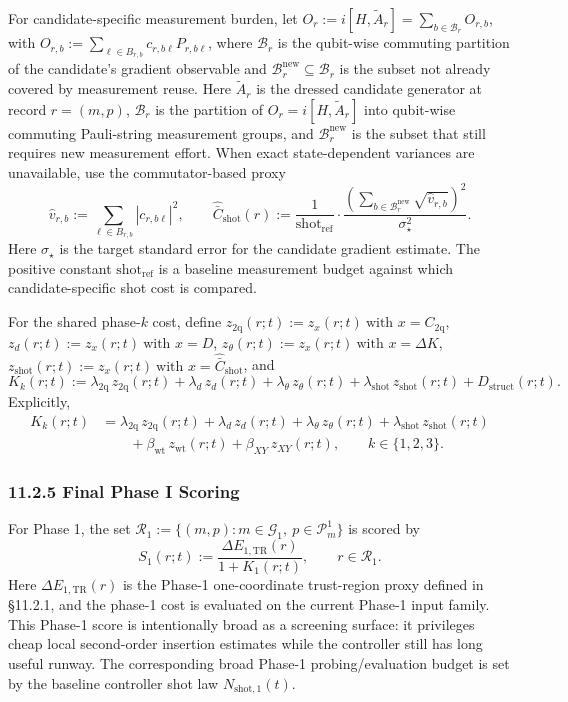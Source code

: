 \documentclass[11pt]{article}
\begin{document}
For candidate-specific measurement burden, let \(O_r:=i[H,\widetilde A_r]=\sum_{b\in\mathcal B_r} O_{r,b}\), with \(O_{r,b}:=\sum_{\ell\in B_{r,b}} c_{r,b\ell} P_{r,b\ell}\), where \(\mathcal B_r\) is the qubit-wise commuting partition of the candidate's gradient observable and \(\mathcal B_r^{\mathrm{new}}\subseteq\mathcal B_r\) is the subset not already covered by measurement reuse. Here \(\widetilde A_r\) is the dressed candidate generator at record \(r=(m,p)\), \(\mathcal B_r\) is the partition of \(O_r=i[H,\widetilde A_r]\) into qubit-wise commuting Pauli-string measurement groups, and \(\mathcal B_r^{\mathrm{new}}\) is the subset that still requires new measurement effort. When exact state-dependent variances are unavailable, use the commutator-based proxy
\[
\widehat v_{r,b}:=\sum_{\ell\in B_{r,b}} |c_{r,b\ell}|^2,
\qquad
\widehat{\bar C}_{\mathrm{shot}}(r):=
\frac{1}{\mathrm{shot}_{\mathrm{ref}}}
\cdot
\frac{
\left(
\sum_{b\in\mathcal B_r^{\mathrm{new}}}\sqrt{\widehat v_{r,b}}
\right)^2
}{
\sigma_{\star}^{2}
}.
\]
Here \(\sigma_\star\) is the target standard error for the candidate gradient estimate. The positive constant \(\mathrm{shot}_{\mathrm{ref}}\) is a baseline measurement budget against which candidate-specific shot cost is compared.

For the shared phase-\(k\) cost, define \(z_{\mathrm{2q}}(r;t):=z_x(r;t)\ \text{with }x=C_{\mathrm{2q}}\), \(z_d(r;t):=z_x(r;t)\ \text{with }x=D\), \(z_{\theta}(r;t):=z_x(r;t)\ \text{with }x=\Delta K\), \(z_{\mathrm{shot}}(r;t):=z_x(r;t)\ \text{with }x=\widehat{\bar C}_{\mathrm{shot}}\), and
\[
K_k(r;t):=
\lambda_{\mathrm{2q}}\,z_{\mathrm{2q}}(r;t)
+\lambda_d\,z_d(r;t)
+\lambda_\theta\,z_{\theta}(r;t)
+\lambda_{\mathrm{shot}}\,z_{\mathrm{shot}}(r;t)
+D_{\mathrm{struct}}(r;t).
\]
Explicitly,
\[
\begin{aligned}
K_k(r;t)
&=
\lambda_{\mathrm{2q}}\,z_{\mathrm{2q}}(r;t)
+\lambda_d\,z_d(r;t)
+\lambda_\theta\,z_{\theta}(r;t)
+\lambda_{\mathrm{shot}}\,z_{\mathrm{shot}}(r;t)\\
&\qquad
+\beta_{\mathrm{wt}}\,z_{\mathrm{wt}}(r;t)
+\beta_{XY}\,z_{XY}(r;t),
\qquad
k\in\{1,2,3\}.
\end{aligned}
\]

\subsubsection*{11.2.5 Final Phase I Scoring}
For Phase 1, the set \(\mathcal R_1:=\{(m,p):m\in\mathcal G_1,\ p\in\mathcal P_m^{1}\}\) is scored by
\[
S_1(r;t)
:=
\frac{\Delta E_{1,\mathrm{TR}}(r)}{1+K_1(r;t)},
\qquad r\in\mathcal R_1.
\]
Here \(\Delta E_{1,\mathrm{TR}}(r)\) is the Phase-1 one-coordinate trust-region proxy defined in \S 11.2.1, and the phase-1 cost is evaluated on the current Phase-1 input family. This Phase-1 score is intentionally broad as a screening surface: it privileges cheap local second-order insertion estimates while the controller still has long useful runway.
The corresponding broad Phase-1 probing/evaluation budget is set by the baseline controller shot law \(N_{\mathrm{shot},1}(t)\).
\end{document}
